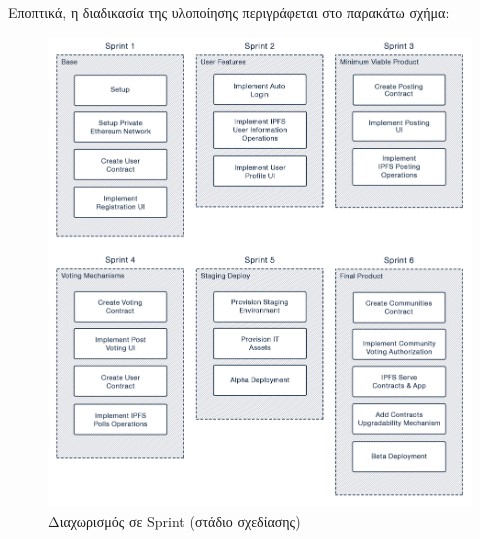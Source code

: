 \newpage
Εποπτικά, η διαδικασία της υλοποίησης περιγράφεται στο παρακάτω σχήμα:

\vspace{\baselineskip}

\begin{figure}[H]
    \centering
    \includegraphics[width=\textwidth]{assets/figures/chapter-3/3.8.implementation-methodology-specification-sprints.png}
    \caption{Διαχωρισμός σε Sprint (στάδιο σχεδίασης)}
    \label{figure:3.8.implementation-methodology-specification-sprints}
\end{figure}
